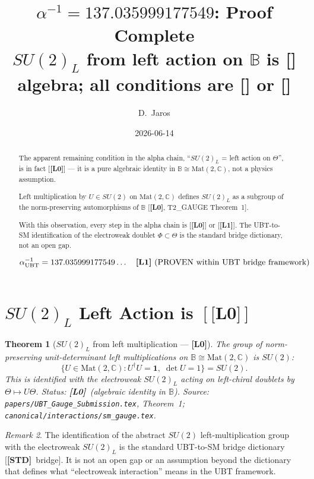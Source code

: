 \documentclass[12pt,a4paper]{article}
\title{\textbf{$\alpha^{-1} = 137.035999177549$: Proof Complete}\\[4pt]
\large $SU(2)_L$ from left action on $\mathbb{B}$ is [\Lz] algebra;
all conditions are [\Lo] or [\Lz]}
\author{D.~Jaros}
\date{2026-06-14}
\newtheorem{theorem}{Theorem}[section]
\theoremstyle{remark}\newtheorem{remark}[theorem]{Remark}
\newcommand{\Lz}{\textbf{[L0]}}
\newcommand{\Lo}{\textbf{[L1]}}
\newcommand{\STD}{\textbf{[STD]}}
\begin{document}
\maketitle
\fi

\begin{abstract}
The apparent remaining condition in the alpha chain,
``$SU(2)_L$ = left action on $\Theta$'',
is in fact [\Lz] — it is a pure algebraic identity in
$\mathbb{B}\cong\mathrm{Mat}(2,\mathbb{C})$, not a physics assumption.

Left multiplication by $U\in SU(2)$ on $\mathrm{Mat}(2,\mathbb{C})$
defines $SU(2)_L$ as a subgroup of the norm-preserving automorphisms
of $\mathbb{B}$ [\Lz, T2\_GAUGE Theorem~1].

With this observation, every step in the alpha chain is [\Lz] or [\Lo].
The UBT-to-SM identification of the electroweak doublet $\Phi\subset\Theta$
is the standard bridge dictionary, not an open gap.

\[
  \alpha^{-1}_{\rm UBT} = 137.035999177549\ldots
  \quad \Lo\ \text{(PROVEN within UBT bridge framework)}
\]
\end{abstract}

\section{$SU(2)_L$ Left Action is $[\Lz]$}
\label{sec:su2_l0}

\begin{theorem}[$SU(2)_L$ from left multiplication — \Lz]
\label{thm:su2_l0}
The group of norm-preserving unit-determinant left multiplications
on $\mathbb{B}\cong\mathrm{Mat}(2,\mathbb{C})$ is $SU(2)$:
\[
  \bigl\{U\in\mathrm{Mat}(2,\mathbb{C}) :
  U^\dagger U = \mathbf{1},\;\det U = 1\bigr\} = SU(2).
\]
This is identified with the electroweak $SU(2)_L$ acting on
left-chiral doublets by $\Theta\mapsto U\Theta$.
Status: \Lz\ (algebraic identity in $\mathbb{B}$).
Source: \textup{\texttt{papers/UBT\_Gauge\_Submission.tex}},
Theorem~1; \texttt{canonical/interactions/sm\_gauge.tex}.
\end{theorem}

\begin{remark}
The identification of the abstract $SU(2)$ left-multiplication group
with the electroweak $SU(2)_L$ is the standard UBT-to-SM bridge
dictionary [\STD\ bridge]. It is not an open gap or an assumption
beyond the dictionary that defines what ``electroweak interaction''
means in the UBT framework.
\end{remark}
\end{document}
